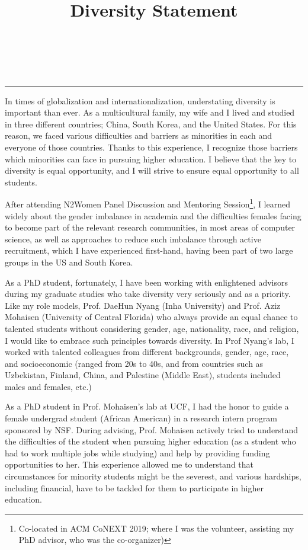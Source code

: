 \documentclass{NSF}
\begin{document}
\title{Diversity Statement}\\
\\\rule{\textwidth}{1.5pt}\vspace{3mm}
\thispagestyle{empty}
In times of globalization and internationalization, understating diversity is important than ever.  
As a multicultural family, my wife and I lived and studied in three different countries; China, South Korea, and the United States. For this reason, we faced various difficulties and barriers as minorities in each and everyone of those countries. Thanks to this experience, I recognize those barriers which minorities can face in pursuing higher education. I believe that the key to diversity is equal opportunity, and I will strive to ensure equal opportunity to all students.  

After attending N2Women Panel Discussion and Mentoring Session\footnote{Co-located in ACM CoNEXT 2019; where I was the volunteer, assisting my PhD advisor, who was the co-organizer)}, I learned widely about the gender imbalance in academia and the difficulties females facing to become part of the relevant research communities, in most areas of computer science, as well as approaches to reduce such imbalance through active recruitment, which I have experienced first-hand, having been part of two large groups in the US and South Korea.

As a PhD student, fortunately, I have been working with enlightened advisors during my graduate studies who take diversity very seriously and as a priority. Like my role models, Prof. DaeHun Nyang (Inha University) and Prof. Aziz Mohaisen (University of Central Florida) who always provide an equal chance to talented students without considering gender, age, nationality, race, and religion, I would like to embrace such principles towards diversity. In Prof Nyang's lab, I worked with talented colleagues  from different backgrounds, gender, age, race, and socioeconomic (ranged from 20s to 40s, and from countries such as Uzbekistan, Finland, China, and Palestine (Middle East), students included males and females, etc.) 

As a PhD student in Prof. Mohaisen's lab at UCF, I had the honor to guide a female undergrad student (African American) in a research intern program sponsored by NSF. During advising, Prof. Mohaisen actively tried to understand the difficulties of the student when pursuing higher education (as a student who had to work multiple jobs while studying) and help by providing funding opportunities to her. This experience allowed me to understand that circumstances for minority students might be the severest, and various hardships, including financial, have to be tackled for them to participate in higher education. 
\end{document}
